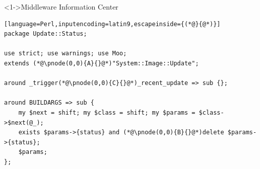 \documentclass[ngerman,xcolor={table,dvipsnames},smaller,compress,hyperref={bookmarks,colorlinks}]{beamer}%
\begin{document}
\begin{frame}[t,fragile]

\begin{block}<1->{Middleware Information Center}
\scriptsize
\begin{lstlisting}[language=Perl,inputencoding=latin9,escapeinside={(*@}{@*)}]
package Update::Status;

use strict; use warnings; use Moo;
extends (*@\pnode(0,0){A}{}@*)"System::Image::Update";

around _trigger(*@\pnode(0,0){C}{}@*)_recent_update => sub {};

around BUILDARGS => sub {
    my $next = shift; my $class = shift; my $params = $class->$next(@_);
    exists $params->{status} and (*@\pnode(0,0){B}{}@*)delete $params->{status};
    $params;
};
\end{lstlisting}
\end{block}

\begin{itemize}
\end{itemize}


\end{frame}
\end{document}
